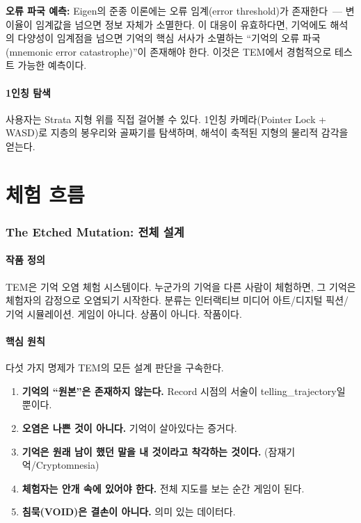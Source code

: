 \documentclass[11pt, a4paper]{article}
\begin{document}
\textbf{오류 파국 예측:} Eigen의 준종 이론에는 오류 임계(error threshold)가 존재한다~--- 변이율이 임계값을 넘으면 정보 자체가 소멸한다. 이 대응이 유효하다면, 기억에도 해석의 다양성이 임계점을 넘으면 기억의 핵심 서사가 소멸하는 ``기억의 오류 파국(mnemonic error catastrophe)''이 존재해야 한다. 이것은 TEM에서 경험적으로 테스트 가능한 예측이다.

\subsection{1인칭 탐색}

사용자는 Strata 지형 위를 직접 걸어볼 수 있다. 1인칭 카메라(Pointer Lock + WASD)로 지층의 봉우리와 골짜기를 탐색하며, 해석이 축적된 지형의 물리적 감각을 얻는다.



\part{체험 흐름}

\section{The Etched Mutation: 전체 설계}

\subsection{작품 정의}

TEM은 기억 오염 체험 시스템이다. 누군가의 기억을 다른 사람이 체험하면, 그 기억은 체험자의 감정으로 오염되기 시작한다. 분류는 인터랙티브 미디어 아트/디지털 픽션/기억 시뮬레이션. 게임이 아니다. 상품이 아니다. 작품이다.

\subsection{핵심 원칙}

다섯 가지 명제가 TEM의 모든 설계 판단을 구속한다.

\begin{enumerate}
\item \textbf{기억의 ``원본''은 존재하지 않는다.} Record 시점의 서술이 telling\_trajectory일 뿐이다.
\item \textbf{오염은 나쁜 것이 아니다.} 기억이 살아있다는 증거다.
\item \textbf{기억은 원래 남이 했던 말을 내 것이라고 착각하는 것이다.} (잠재기억/Cryptomnesia)
\item \textbf{체험자는 안개 속에 있어야 한다.} 전체 지도를 보는 순간 게임이 된다.
\item \textbf{침묵(VOID)은 결손이 아니다.} 의미 있는 데이터다.
\end{enumerate}
\end{document}
